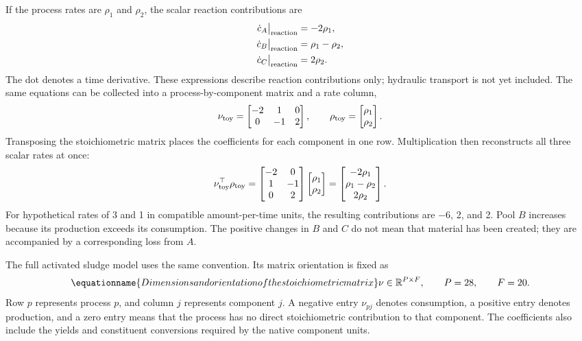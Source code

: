 If the process rates are $\rho_1$ and $\rho_2$, the scalar reaction contributions are
\[
\begin{aligned}
\dot c_A\big|_{\rm reaction}&=-2\rho_1,\\
\dot c_B\big|_{\rm reaction}&=\rho_1-\rho_2,\\
\dot c_C\big|_{\rm reaction}&=2\rho_2.
\end{aligned}
\]
The dot denotes a time derivative. These expressions describe reaction contributions only; hydraulic transport is not yet included. The same equations can be collected into a process-by-component matrix and a rate column,
\[
\nu_{\rm toy}=\begin{bmatrix}-2&1&0\\0&-1&2\end{bmatrix},\qquad
\rho_{\rm toy}=\begin{bmatrix}\rho_1\\\rho_2\end{bmatrix}.
\]
Transposing the stoichiometric matrix places the coefficients for each component in one row. Multiplication then reconstructs all three scalar rates at once:
\[
\nu_{\rm toy}^\top\rho_{\rm toy}
=\begin{bmatrix}-2&0\\1&-1\\0&2\end{bmatrix}
\begin{bmatrix}\rho_1\\\rho_2\end{bmatrix}
=\begin{bmatrix}-2\rho_1\\\rho_1-\rho_2\\2\rho_2\end{bmatrix}.
\]
For hypothetical rates of 3 and 1 in compatible amount-per-time units, the resulting contributions are $-6$, 2, and 2. Pool $B$ increases because its production exceeds its consumption. The positive changes in $B$ and $C$ do not mean that material has been created; they are accompanied by a corresponding loss from $A$.

The full activated sludge model uses the same convention. Its matrix orientation is fixed as
\begin{equation}
\equationname{Dimensions and orientation of the stoichiometric matrix}
\nu\in\mathbb{R}^{P\times F},\qquad P=28,\qquad F=20.
\label{eq:petersen_orientation}
\end{equation}
Row $p$ represents process $p$, and column $j$ represents component $j$. A negative entry $\nu_{pj}$ denotes consumption, a positive entry denotes production, and a zero entry means that the process has no direct stoichiometric contribution to that component. The coefficients also include the yields and constituent conversions required by the native component units.

